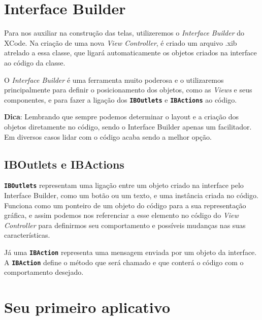 \documentclass[a4paper,12pt,brazil,doubleside]{book}
\begin{document}
\begin{singlespace}
\section{Interface Builder}


Para nos auxiliar na construção das telas, utilizeremos o \emph{Interface Builder} do XCode. Na criação de uma nova \emph{View Controller}, é criado um arquivo .xib atrelado a essa classe, que ligará automaticamente os objetos criados na interface ao código da classe.

O \emph{Interface Builder} é uma ferramenta muito poderosa e o utilizaremos principalmente para definir o posicionamento dos objetos, como as \emph{Views} e seus componentes, e para fazer a ligação dos \texttt{\textbf{IBOutlets}} e \texttt{\textbf{IBActions}} ao código.

\bigskip

\begin{framed}

\textbf{Dica}:  Lembrando que sempre podemos determinar o layout e a criação dos objetos diretamente no código, sendo o Interface Builder apenas um facilitador. Em diversos casos lidar com o código acaba sendo a melhor opção.
\end{framed}

\bigskip

\subsection{IBOutlets e IBActions}


\texttt{\textbf{IBOutlets}} representam uma ligação entre um objeto criado na interface pelo Interface Builder, como um botão ou um texto, e uma instância criada no código. Funciona como um ponteiro de um objeto do código para a sua representação gráfica, e assim podemos nos referenciar a esse elemento no código do \emph{View Controller} para definirmos seu comportamento e possíveis mudanças nas suas características.

Já uma \texttt{\textbf{IBAction}} representa uma mensagem enviada por um objeto da interface. A \texttt{\textbf{IBAction}} define o método que será chamado e que conterá o código com o comportamento desejado.

\bigskip
\bigskip


\section{Seu primeiro aplicativo}



\end{singlespace}
\end{document}
